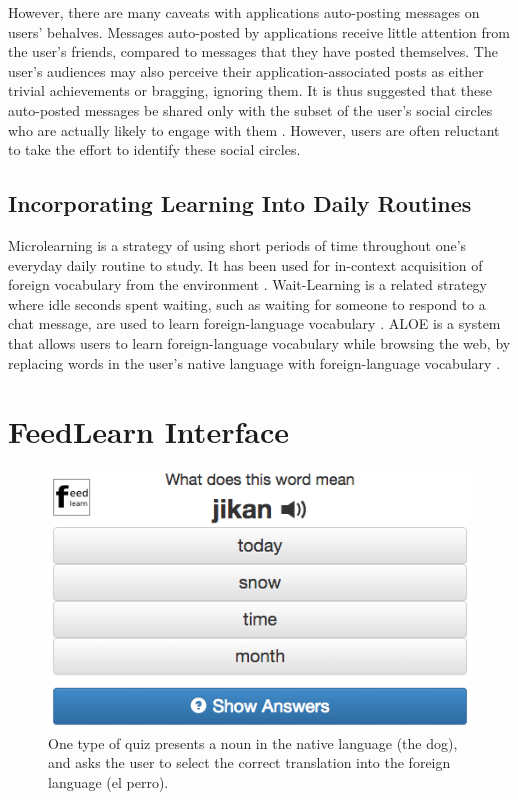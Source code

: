 \documentclass{chi-ext}
\begin{document}
However, there are many caveats with applications auto-posting messages on users' behalves. Messages auto-posted by applications receive little attention from the user's friends, compared to messages that they have posted themselves. The user's audiences may also perceive their application-associated posts as either trivial achievements or bragging, ignoring them. It is thus suggested that these auto-posted messages be shared only with the subset of the user's social circles who are actually likely to engage with them \cite{socialsharing}. However, users are often reluctant to take the effort to identify these social circles.

\subsection{Incorporating Learning Into Daily Routines}

Microlearning is a strategy of using short periods of time throughout one's everyday daily routine to study. It has been used for in-context acquisition of foreign vocabulary from the environment \cite{microlearning} \cite{micromandarin}. Wait-Learning is a related strategy where idle seconds spent waiting, such as waiting for someone to respond to a chat message, are used to learn foreign-language vocabulary \cite{waitlearning}. ALOE is a system that allows users to learn foreign-language vocabulary while browsing the web, by replacing words in the user's native language with foreign-language vocabulary \cite{augmenting}.

\section{FeedLearn Interface}

\begin{figure}
\centering
\includegraphics[width=2.0\columnwidth]{quiz1}
\caption{One type of quiz presents a noun in the native language (the dog), and asks the user to select the correct translation into the foreign language (el perro).}
\label{fig:quiz1}
\end{figure}
\end{document}
